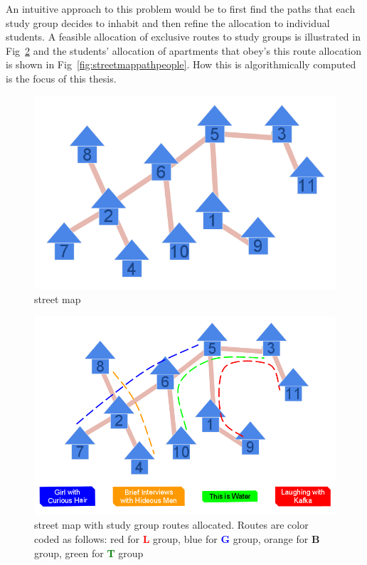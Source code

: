 \documentclass[MS,]{iitmdiss}
\begin{document}
An intuitive approach to this problem would be to first find the paths
that each study group decides to inhabit and then refine the
allocation to individual students. A feasible allocation of exclusive
routes to study groups is illustrated in Fig~\ref{fig:streetmappath}
and the students' allocation of apartments that obey's this route
allocation is shown in Fig~\ref{fig:streetmappathpeople}. How this is
algorithmically computed is the focus of this thesis.

\begin{figure}[h]
  \centering
  \includegraphics[scale=0.3]{../img/1_infinite_loop.png}
  \caption{{\residenceblock} street map}
  \label{fig:streetmap}
\end{figure}

\begin{figure}[h]
  \centering
  \includegraphics[scale=0.5]{../img/2_infinite_loop.png}
  \caption{{\residenceblock} street map with study group routes
    allocated. Routes are color coded as follows: red for
    \textcolor{red}{\bf L} group, blue for \textcolor{blue}{\bf G}
    group, orange for \textcolor{YellowOrange}{\bf B} group, green for
    \textcolor{green}{\bf T} group}
  \label{fig:streetmappath}
\end{figure}
\end{document}
